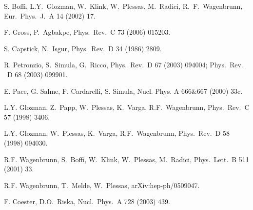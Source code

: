 \begin{thebibliography}{PPV06}
S. Boffi, L.Y.~Glozman, W.~Klink, W.~Plessas, M.~Radici, R.~F.~Wagenbrunn, 
  Eur.\ Phys.\ J.\ A  14 (2002) 17.

  F. Gross, P.~Agbakpe,
  Phys.\ Rev.\ C  73 (2006) 015203.

  S. Capstick, N.~Isgur,
  Phys.\ Rev.\ D  34 (1986) 2809.

  R. Petronzio, S.~Simula, G.~Ricco,
  Phys.\ Rev.\ D  67 (2003) 094004; Phys.\ Rev. \ D  68 (2003) 099901.

E. Pace, G. Salme, F. Cardarelli, S. Simula, 
Nucl. Phys. A  666$ \& $667 (2000) 33c. 

  L.Y. Glozman, Z.~Papp, W.~Plessas, K.~Varga, R.F.~Wagenbrunn,
  Phys.\ Rev.\ C  57 (1998) 3406. 

  L.Y. Glozman, W.~Plessas, K.~Varga, R.F.~Wagenbrunn,
  Phys.\ Rev.\ D  58 (1998) 094030.

  R.F. Wagenbrunn, S.~Boffi, W.~Klink, W.~Plessas, M.~Radici,
  Phys.\ Lett.\ B  511 (2001) 33.

  R.F. Wagenbrunn, T.~Melde, W.~Plessas,
  arXiv:hep-ph/0509047.

  F. Coester, D.O.~Riska,
  Nucl.\ Phys.\ A  728 (2003) 439. 


\end{thebibliography}
